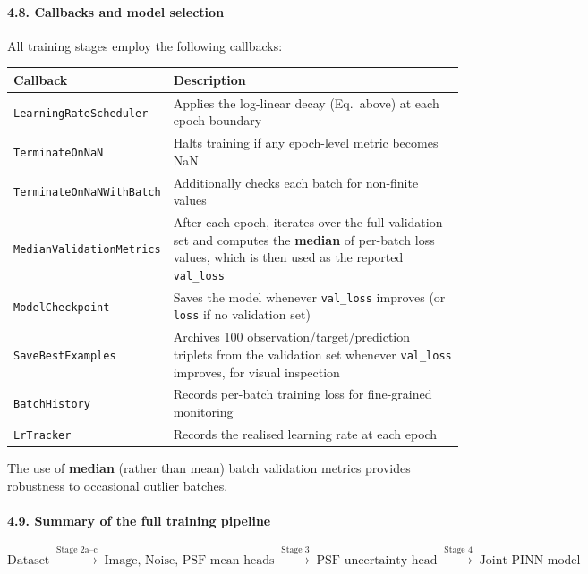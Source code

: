 \documentclass{aa}
\begin{document}
\paragraph{4.8. Callbacks and model selection}

All training stages employ the following callbacks:

\begin{table}[h]
\centering
\begin{tabular}{|l|p{9cm}|}
\hline
\textbf{Callback} & \textbf{Description} \\
\hline
\texttt{LearningRateScheduler} & Applies the log-linear decay (Eq.~above) at each epoch boundary \\
\texttt{TerminateOnNaN} & Halts training if any epoch-level metric becomes NaN \\
\texttt{TerminateOnNaNWithBatch} & Additionally checks each batch for non-finite values \\
\texttt{MedianValidationMetrics} & After each epoch, iterates over the full validation set and computes the \textbf{median} of per-batch loss values, which is then used as the reported \texttt{val\_loss} \\
\texttt{ModelCheckpoint} & Saves the model whenever \texttt{val\_loss} improves (or \texttt{loss} if no validation set) \\
\texttt{SaveBestExamples} & Archives 100 observation/target/prediction triplets from the validation set whenever \texttt{val\_loss} improves, for visual inspection \\
\texttt{BatchHistory} & Records per-batch training loss for fine-grained monitoring \\
\texttt{LrTracker} & Records the realised learning rate at each epoch \\
\hline
\end{tabular}
\end{table}

The use of \textbf{median} (rather than mean) batch validation metrics provides robustness to occasional outlier batches.

\paragraph{4.9. Summary of the full training pipeline}

\begin{equation}
\boxed{
\text{Dataset}
\;\xrightarrow{\text{Stage 2a--c}}\;
\text{Image, Noise, PSF-mean heads}
\;\xrightarrow{\text{Stage 3}}\;
\text{PSF uncertainty head}
\;\xrightarrow{\text{Stage 4}}\;
\text{Joint PINN model}
}
\end{equation}
\end{document}
